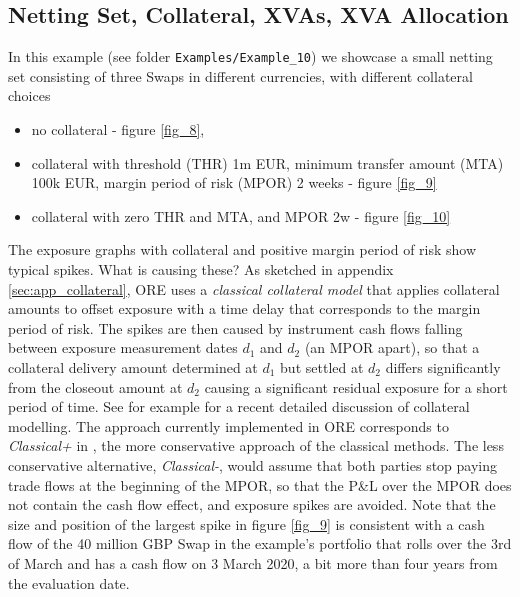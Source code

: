 \documentclass[12pt, a4paper]{article}
\begin{document}
{%
\subsection{Netting Set, Collateral, XVAs, XVA Allocation}

In this example (see folder {\tt Examples/Example\_10}) we showcase a small netting set consisting of three Swaps in
different currencies, with different collateral choices
\begin{itemize}
\item no collateral - figure \ref{fig_8},
\item collateral with threshold (THR) 1m EUR, minimum transfer amount (MTA) 100k EUR, margin period of risk (MPOR) 2
  weeks - figure \ref{fig_9}
\item collateral with zero THR and MTA, and MPOR 2w - figure \ref{fig_10}
\end{itemize}
The exposure graphs with collateral and positive margin period of risk show typical spikes. What is causing these? As
sketched in appendix \ref{sec:app_collateral}, ORE uses a {\em classical collateral model} that applies collateral
amounts to offset exposure with a time delay that corresponds to the margin period of risk. The spikes are then caused
by instrument cash flows falling between exposure measurement dates $d_1$ and $d_2$ (an MPOR apart), so that a
collateral delivery amount determined at $d_1$ but settled at $d_2$ differs significantly from the closeout amount at
$d_2$ causing a significant residual exposure for a short period of time. See for example \cite{Andersen2016} for a
recent detailed discussion of collateral modelling. The approach currently implemented in ORE corresponds to {\em
  Classical+} in \cite{Andersen2016}, the more conservative approach of the classical methods. The less conservative
alternative, {\em Classical-}, would assume that both parties stop paying trade flows at the beginning of the MPOR, so
that the P\&L over the MPOR does not contain the cash flow effect, and exposure spikes are avoided. Note that the size
and position of the largest spike in figure \ref{fig_9} is consistent with a cash flow of the 40 million GBP Swap in the
example's portfolio that rolls over the 3rd of March and has a cash flow on 3 March 2020, a bit more than four years
from the evaluation date.
  
}
\end{document}
